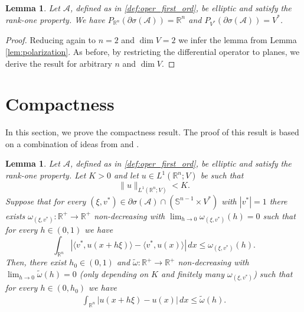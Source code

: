 \documentclass[11pt,reqno]{amsart}
\theoremstyle{plain}
\newtheorem{lemma}[theorem]{Lemma}
\theoremstyle{definition}
\theoremstyle{remark}
\numberwithin{equation}{section}
\newcommand{\R}{\mathbb{R}}
\newcommand{\s}{\mathbb{S}}
\newcommand{\A}{\mathcal{A}}
\newcommand{\1}{\mathbbm{1}} %
\begin{document}
\begin{lemma}\label{lem:directional_spectrum_surjectivity_projections}
    Let $\A$, defined as in \eqref{def:oper_first_ord}, be elliptic and satisfy the rank-one property. We have $P_{\R^n}(\partial \sigma(\A)) = \R^n$ and $P_{V^*}(\partial \sigma(\A)) = V^*$.
\end{lemma}
\begin{proof}
    Reducing again to $n = 2$ and $\dim V = 2$ we infer the lemma from Lemma \ref{lem:polarization}. As before, by restricting the differential operator to planes, we derive the result for arbitrary $n$ and $\dim V$.
\end{proof}


\section{Compactness}
\label{sec:compactness}

In this section, we prove the compactness result. The proof of this result is based on a combination of ideas from \cite{AR20} and \cite[Section 10]{DM13}.

\begin{lemma}
\label{lem:translation_lemma}
    Let $\A$, defined as in \eqref{def:oper_first_ord}, be elliptic and satisfy the rank-one property. Let $K > 0$ and let $u \in L^1(\R^n; V)$ be such that 
    $$\| u \|_{L^1(\R^n; V)} < K.$$ 
    Suppose that for every $(\xi, v^*) \in \partial \sigma(\A) \cap (\s^{n-1} \times V^*)$ with $|v^*| = 1$ there exists $\omega_{(\xi, v^*)}: \R^+ \to \R^+$ non-decreasing with $\lim_{h \to 0} \omega_{(\xi, v^*)}(h) = 0$ such that for every $h \in (0,1)$ we have
    \[
        \int_{\R^n} |\langle v^*, u(x + h \xi)\rangle - \langle v^*, u(x) \rangle| \, dx \leq \omega_{(\xi, v^*)}(h).
    \]
    Then, there exist $h_0 \in (0,1)$ and $\tilde \omega : \R^+ \to \R^+$ non-decreasing with $\lim_{h \to 0} \tilde \omega(h) = 0$ (only depending on $K$ and finitely many $\omega_{(\xi, v^*)}$) such that for every $h \in (0, h_0)$ we have
    \begin{align}\label{eq:to_show}
        \int_{\R^n} |u(x + h \xi)- u(x)| \, dx \leq \tilde \omega(h).
    \end{align}
\end{lemma}
\end{document}
